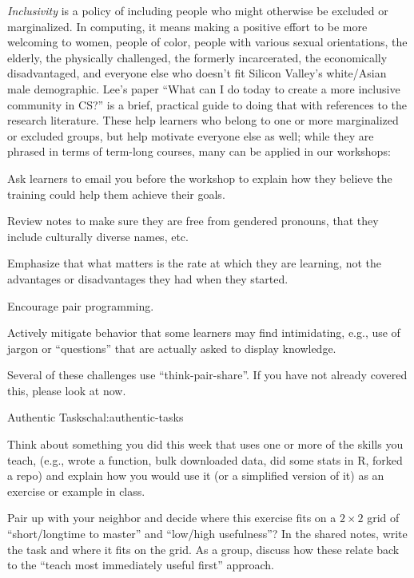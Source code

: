 \emph{Inclusivity} is a policy of including people who might otherwise
be excluded or marginalized. In computing, it means making a positive
effort to be more welcoming to women, people of color, people with
various sexual orientations, the elderly, the physically challenged,
the formerly incarcerated, the economically disadvantaged, and
everyone else who doesn't fit Silicon Valley's white/Asian male
demographic. Lee's paper ``What can I do today to create a more
inclusive community in CS?'' \cite{bib:lee-create-inclusive-community}
is a brief, practical guide to doing that with references to the
research literature. These help learners who belong to one or more
marginalized or excluded groups, but help motivate everyone else as
well; while they are phrased in terms of term-long courses, many can
be applied in our workshops:

\begin{gitemize}

\item
  Ask learners to email you before the workshop to explain how they
  believe the training could help them achieve their goals.

\item
  Review notes to make sure they are free from gendered pronouns, that
  they include culturally diverse names, etc.

\item
  Emphasize that what matters is the rate at which they are learning,
  not the advantages or disadvantages they had when they started.

\item
  Encourage pair programming.

\item
  Actively mitigate behavior that some learners may find intimidating,
  e.g., use of jargon or ``questions'' that are actually asked to
  display knowledge.

\end{gitemize}


Several of these challenges use ``think-pair-share''.  If you have
not already covered this, please look at  now.

\begin{challenge}{Authentic Tasks}{chal:authentic-tasks}

Think about something you did this week that uses one or more of the
skills you teach, (e.g., wrote a function, bulk downloaded data, did
some stats in R, forked a repo) and explain how you would use it (or a
simplified version of it) as an exercise or example in class.

Pair up with your neighbor and decide where this exercise fits on a
$2{\times}2$ grid of ``short/longtime to master'' and ``low/high
usefulness''?  In the shared notes, write the task and where it fits
on the grid. As a group, discuss how these relate back to the ``teach
most immediately useful first'' approach.

\end{challenge}

